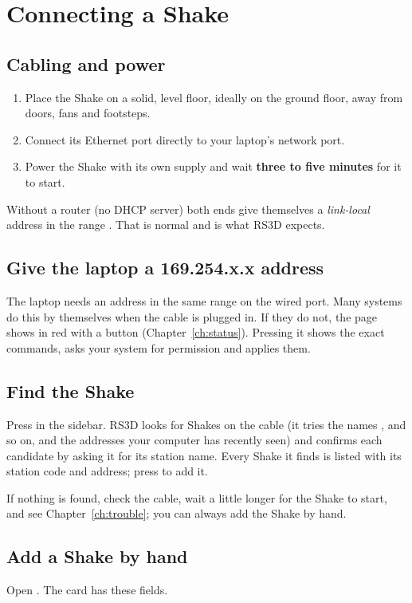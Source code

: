 \chapter{Connecting a Shake}\label{ch:connect}

\section{Cabling and power}
\begin{enumerate}
\item Place the Shake on a solid, level floor, ideally on the ground floor, away from doors, fans and footsteps.
\item Connect its Ethernet port directly to your laptop's network port.
\item Power the Shake with its own supply and wait \textbf{three to five minutes} for it to start.
\end{enumerate}
Without a router (no DHCP server) both ends give themselves a \emph{link-local} address in the range . That
is normal and is what RS3D expects.

\section{Give the laptop a 169.254.x.x address}
The laptop needs an address in the same range on the wired port. Many systems do this by themselves when the cable is plugged in.
If they do not, the  page shows  in red with a  button
(Chapter~\ref{ch:status}). Pressing it shows the exact commands, asks your system for permission and applies them.

\section{Find the Shake}
Press  in the sidebar. RS3D looks for Shakes on the cable (it tries the names ,
 and so on, and the addresses your computer has recently seen) and confirms each candidate by asking it for
its station name. Every Shake it finds is listed with its station code and address; press  to add it.

If nothing is found, check the cable, wait a little longer for the Shake to start, and see Chapter~\ref{ch:trouble}; you can always add
the Shake by hand.

\section{Add a Shake by hand}
Open . The  card has these fields.

